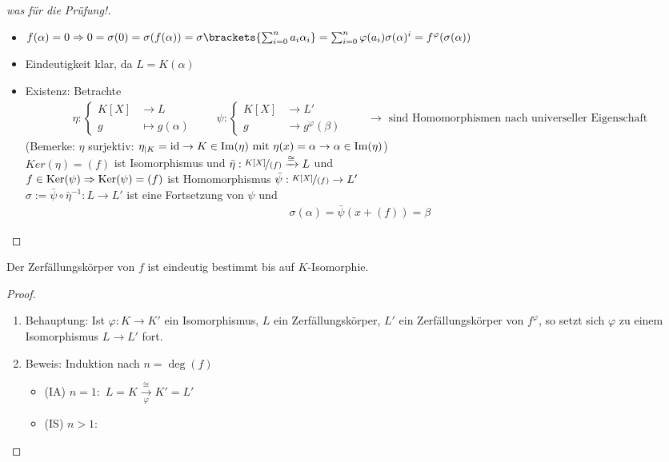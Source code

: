 \begin{proof}[was für die Prüfung!]
	\begin{itemize}
		\item $f(\alpha) = 0 \Rightarrow 0 = \sigma(0) = \sigma(f(\alpha)) = \sigma\brackets{\sum_{i=0}^n a_i \alpha_i} = \sum_{i=0}^n \varphi(a_i)\sigma(\alpha)^i = f^{\varphi}(\sigma(\alpha))$
		\item Eindeutigkeit klar, da $L=K(\alpha)$
		\item Existenz: Betrachte 
		\begin{align*}
			\eta: 
			\begin{cases}
				K[X] &\to L\\
				g &\mapsto g(\alpha)
			\end{cases}\qquad
			\psi:
			\begin{cases}
				K[X] &\to L'\\
				g &\to g^{\varphi}(\beta) 
			\end{cases}\qquad \to \text{ sind Homomorphismen nach universeller Eigenschaft}
		\end{align*}
		(Bemerke: $\eta$ surjektiv: $\eta_{\mid K} = \operatorname{id} \to K \in \operatorname{Im}(\eta) \text{ mit } \eta(x) = \alpha \to \alpha \in \operatorname{Im}(\eta)$)\\
		$Ker(\eta)=(f)$ ist Isomorphismus und $\bar{\eta}: \lnkset{K[X]}{(f)} \xrightarrow{\cong}L$ und\\
		$f \in \operatorname{Ker}(\psi) \Rightarrow \operatorname{Ker}(\psi) = (f)$ ist Homomorphismus $\bar{\psi}: \lnkset{K[X]}{(f)} \to L'$\\
		$\sigma:= \bar{\psi}\circ \bar{\eta}^{-1}: L \to L'$ ist eine Fortsetzung von $\psi$ und
		\begin{align*}
			\sigma(\alpha) = \bar{\psi}(x+(f)) = \beta
		\end{align*}
	\end{itemize}
\end{proof}
\begin{proposition}
	Der Zerfällungskörper von $f$ ist eindeutig bestimmt bis auf $K$-Isomorphie.
\end{proposition}
\begin{proof}
	\begin{enumerate} %
		\item Behauptung: Ist $\varphi:K \to K'$ ein Isomorphismus, $L$ ein Zerfällungskörper, $L'$ ein Zerfällungskörper von $f^{\varphi}$, so setzt sich $\varphi$ zu einem Isomorphismus $L \to L'$ fort.
		\item Beweis: Induktion nach $n = \deg(f)$\\
			\begin{itemize} %
				\item (IA) $n=1:$ $L = K \xrightarrow[\varphi]{\cong} K' = L'$ \checkmark
				\item (IS) $n>1:$ $ $ %
			\end{itemize}
	\end{enumerate}
\end{proof}
